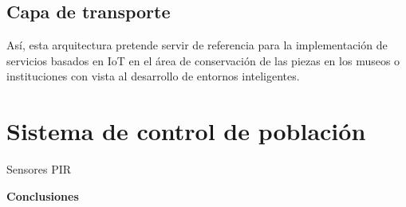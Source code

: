     \subsection{Capa de transporte}\label{subsec:capa_transporte}

    \vspace{6cm}

    Así, esta arquitectura pretende servir de referencia para la implementación de servicios basados en IoT en el área de conservación de las piezas en los museos o instituciones con vista al desarrollo de entornos inteligentes.\\


    \section{Sistema de control de población}\label{sec: sistemaSeguridad}
    Sensores PIR\\

    \textbf{\Large Conclusiones}\newline